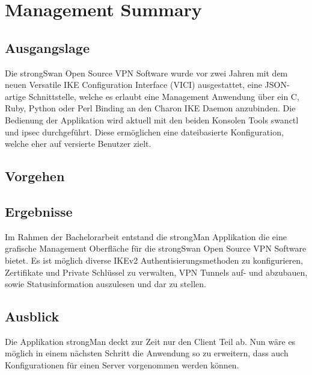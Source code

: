 \section{Management Summary}
\subsection*{Ausgangslage}
Die strongSwan Open Source VPN Software wurde vor zwei Jahren mit dem neuen Versatile
IKE Configuration Interface (VICI) ausgestattet, eine JSON-artige Schnittstelle, welche es erlaubt eine Management Anwendung über ein C, Ruby, Python oder Perl Binding an den Charon
IKE Daemon anzubinden.
Die Bedienung der Applikation wird aktuell mit den beiden Konsolen Tools swanctl und ipsec durchgeführt. Diese ermöglichen eine dateibasierte Konfiguration, welche eher auf versierte Benutzer zielt. 

\subsection*{Vorgehen}



\subsection*{Ergebnisse}
Im Rahmen der Bachelorarbeit entstand die strongMan Applikation die eine grafische Management Oberfläche für die strongSwan Open Source VPN Software bietet. Es ist möglich diverse IKEv2 Authentisierungsmethoden zu konfigurieren, Zertifikate und Private Schlüssel zu verwalten, VPN Tunnels auf- und abzubauen, sowie Statusinformation auszulesen und dar zu stellen.


\subsection*{Ausblick}
Die Applikation strongMan deckt zur Zeit nur den Client Teil ab. Nun wäre es möglich in einem nächsten Schritt die Anwendung so zu erweitern, dass auch Konfigurationen für einen Server vorgenommen werden können.
\newpage